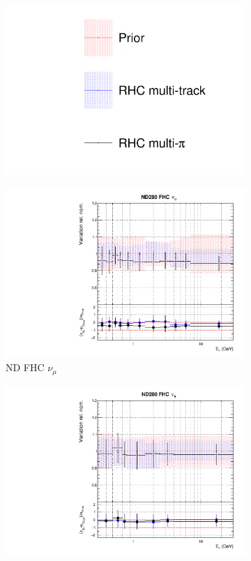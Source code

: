 \begin{figure}[t]
\centering
\begin{subfigure}{0.95\textwidth}
  \centering
  \includegraphics[width=0.24\linewidth]{figs/rhcmpasmv_leg}	
\end{subfigure}
\begin{subfigure}{0.24\textwidth}
  \centering
  \includegraphics[width=0.95\linewidth]{figs/rhcmpasmvflux0}
  \caption{ND FHC $\nu_{\mu}$}
\end{subfigure}
\begin{subfigure}{0.24\textwidth}
  \centering
  \includegraphics[width=0.95\linewidth]{figs/rhcmpasmvflux1}

\end{subfigure}
\end{figure}
